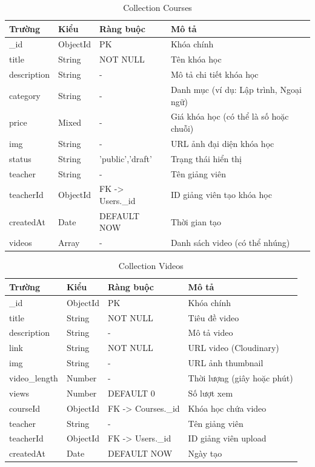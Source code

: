 \begin{table}[H]
\centering
\caption{Collection Courses}
\begin{tabular}{|p{2.5cm}|p{2.5cm}|p{2.5cm}|p{5cm}|}
\hline
\textbf{Trường} & \textbf{Kiểu} & \textbf{Ràng buộc} & \textbf{Mô tả} \\ \hline
\_id & ObjectId & PK & Khóa chính \\ \hline
title & String & NOT NULL & Tên khóa học \\ \hline
description & String & - & Mô tả chi tiết khóa học \\ \hline
category & String & - & Danh mục (ví dụ: Lập trình, Ngoại ngữ) \\ \hline
price & Mixed & - & Giá khóa học (có thể là số hoặc chuỗi) \\ \hline
img & String & - & URL ảnh đại diện khóa học \\ \hline
status & String & 'public','draft' & Trạng thái hiển thị \\ \hline
teacher & String & - & Tên giảng viên \\ \hline
teacherId & ObjectId & FK -> Users.\_id & ID giảng viên tạo khóa học \\ \hline
createdAt & Date & DEFAULT NOW & Thời gian tạo \\ \hline
videos & Array & - & Danh sách video (có thể nhúng) \\ \hline
\end{tabular}
\end{table}

\begin{table}[H]
\centering
\caption{Collection Videos}
\begin{tabular}{|p{2.5cm}|p{2.5cm}|p{2.5cm}|p{5cm}|}
\hline
\textbf{Trường} & \textbf{Kiểu} & \textbf{Ràng buộc} & \textbf{Mô tả} \\ \hline
\_id & ObjectId & PK & Khóa chính \\ \hline
title & String & NOT NULL & Tiêu đề video \\ \hline
description & String & - & Mô tả video \\ \hline
link & String & NOT NULL & URL video (Cloudinary) \\ \hline
img & String & - & URL ảnh thumbnail \\ \hline
video\_length & Number & - & Thời lượng (giây hoặc phút) \\ \hline
views & Number & DEFAULT 0 & Số lượt xem \\ \hline
courseId & ObjectId & FK -> Courses.\_id & Khóa học chứa video \\ \hline
teacher & String & - & Tên giảng viên \\ \hline
teacherId & ObjectId & FK -> Users.\_id & ID giảng viên upload \\ \hline
createdAt & Date & DEFAULT NOW & Ngày tạo \\ \hline
\end{tabular}
\end{table}

